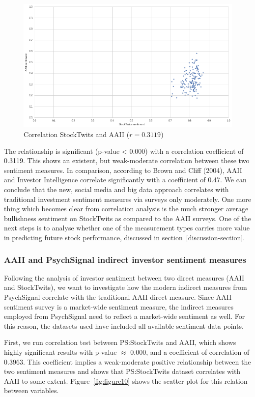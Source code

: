 \begin{figure}[ht]
\centering
\includegraphics[width=1\textwidth]{figures/corrST-AAII.png}
\caption{\label{fig:figure9}Correlation StockTwits and AAII ($r=0.3119$)}
\end{figure}

The relationship is significant (p-value < 0.000) with a correlation coefficient of 0.3119. This shows an existent, but weak-moderate correlation between these two sentiment measures. In comparison, according to Brown and Cliff (2004), AAII and Investor Intelligence correlate significantly with a coefficient of 0.47. We can conclude that the new, social media and big data approach correlates with traditional investment sentiment measures via surveys only moderately. One more thing which becomes clear from correlation analysis is the much stronger average bullishness sentiment on StockTwits as compared to the AAII surveys. One of the next steps is to analyse whether one of the measurement types carries more value in predicting future stock performance, discussed in section~\ref{discussion-section}.

\subsubsection{AAII and PsychSignal indirect investor sentiment measures}
Following the analysis of investor sentiment between two direct measures (AAII and StockTwits), we want to investigate how the modern indirect measures from PsychSignal correlate with the traditional AAII direct measure. Since AAII sentiment survey is a market-wide sentiment measure, the indirect measures employed from PsychSignal need to reflect a market-wide sentiment as well. For this reason, the datasets used have included all available sentiment data points.
\par
First, we run correlation test between PS:StockTwits and AAII, which shows highly significant results with p-value ${\approx}$ 0.000, and a coefficient of correlation of 0.3963. This coefficient implies a weak-moderate positive relationship between the two sentiment measures and shows that PS:StockTwits dataset correlates with AAII to some extent. Figure~\ref{fig:figure10} shows the scatter plot for this relation between variables.

